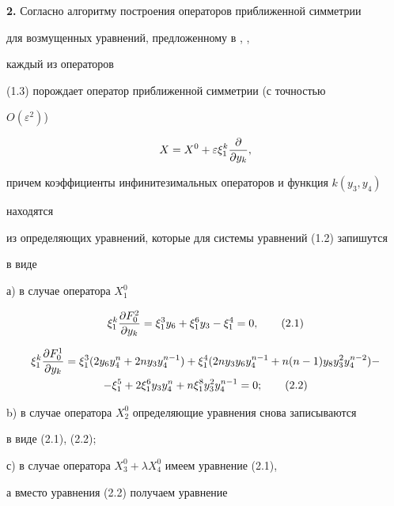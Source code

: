 {\bf 2.} Согласно алгоритму построения операторов приближенной симметрии


для возмущенных уравнений, предложенному в \cite{Bai1}, \cite{Bai2},


каждый из операторов


(1.3) порождает оператор приближенной симметрии (с точностью


$O(\varepsilon^2)$)


$$


X=X^0+\varepsilon\xi^k_1\frac{\pa}{\dy_k},


$$


причем коэффициенты инфинитезимальных операторов и функция $k(y_3,y_4)$


находятся


из определяющих уравнений, которые для системы уравнений (1.2) запишутся


в виде





а) в случае оператора $X^0_1$


\begin{equation}


\xi^k_1\frac{\pa F^2_0}{\dy_k}=\xi^3_1y_6+\xi^6_1y_3-\xi^4_1=0,


\tag{2.1}


\end{equation}


\begin{multline}


\xi^k_1\frac{\pa F^1_0}{\dy_k}=\xi^3_1(2y_6y^n_4+2ny_3y^{n-1}_4)+


\xi^4_1(2ny_3y_6y^{n-1}_4+n(n-1)y_8y^2_3y^{n-2}_4)-\\


-\xi^5_1+


2\xi^6_1y_3y^n_4+n\xi^8_1y^2_3y^{n-1}_4=0;


\tag{2.2}


\end{multline}





b) в случае оператора $X^0_2$ определяющие уравнения снова записываются


в виде (2.1), (2.2);





с) в случае оператора $X^0_3+\lambda X^0_4$ имеем уравнение (2.1),


а вместо уравнения (2.2) получаем уравнение


